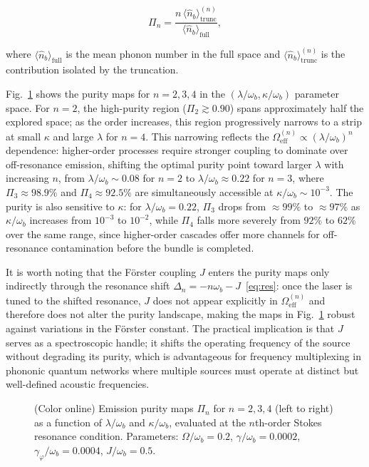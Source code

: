 \documentclass{ws-ijmpb}
\begin{document}
\begin{equation}
	\Pi_n = \frac{n\,\langle\hat{n}_b\rangle^{(n)}_\mathrm{trunc}}
	{\langle\hat{n}_b\rangle_\mathrm{full}},
	\label{eq:purity}
\end{equation}

where $\langle\hat{n}_b\rangle_\mathrm{full}$ is the mean phonon number in the full space and 
$\langle\hat{n}_b\rangle^{(n)}_\mathrm{trunc}$ is the contribution isolated by the truncation.

Fig.~\ref{fig:purity_2qd_heatmap} shows the purity maps for $n = 2, 3, 4$ in the 
$(\lambda/\omega_b, \kappa/\omega_b)$ parameter space. For $n = 2$, the high-purity region 
($\Pi_2 \gtrsim 0.90$) spans approximately half the explored space; as the order increases, 
this region progressively narrows to a strip at small $\kappa$ and large $\lambda$ for $n = 4$. 
This narrowing reflects the $\Omega_\mathrm{eff}^{(n)} \propto (\lambda/\omega_b)^n$ dependence: 
higher-order processes require stronger coupling to dominate over off-resonance emission, 
shifting the optimal purity point toward larger $\lambda$ with increasing $n$, from 
$\lambda/\omega_b \sim 0.08$ for $n = 2$ to $\lambda/\omega_b \approx 0.22$ for $n = 3$, where 
$\Pi_3 \approx 98.9\%$ and $\Pi_4 \approx 92.5\%$ are simultaneously accessible at 
$\kappa/\omega_b \sim 10^{-3}$. The purity is also sensitive to $\kappa$: for 
$\lambda/\omega_b = 0.22$, $\Pi_3$ drops from $\approx 99\%$ to $\approx 97\%$ as 
$\kappa/\omega_b$ increases from $10^{-3}$ to $10^{-2}$, while $\Pi_4$ falls more severely 
from $92\%$ to $62\%$ over the same range, since higher-order cascades offer more channels 
for off-resonance contamination before the bundle is completed.

It is worth noting that the F\"orster coupling $J$ enters the purity maps only indirectly 
through the resonance shift $\Delta_n = -n\omega_b - J$~\eqref{eq:res}: once the laser is 
tuned to the shifted resonance, $J$ does not appear explicitly in $\Omega_\mathrm{eff}^{(n)}$ 
and therefore does not alter the purity landscape, making the maps in 
Fig.~\ref{fig:purity_2qd_heatmap} robust against variations in the F\"orster constant. The 
practical implication is that $J$ serves as a spectroscopic handle; it shifts the operating 
frequency of the source without degrading its purity, which is advantageous for frequency 
multiplexing in phononic quantum networks where multiple sources must operate at distinct but 
well-defined acoustic frequencies.

\begin{figure}[H]
	\centering
	
	\caption{(Color online) Emission purity maps $\Pi_n$ for $n = 2, 3, 4$ (left to right) as a function of 
		$\lambda/\omega_b$ and $\kappa/\omega_b$, evaluated at the $n$th-order Stokes resonance 
		condition. Parameters: $\Omega/\omega_b = 0.2$, $\gamma/\omega_b = 0.0002$, 
		$\gamma_\varphi/\omega_b = 0.0004$, $J/\omega_b = 0.5$.}
	\label{fig:purity_2qd_heatmap}
\end{figure}
\end{document}
